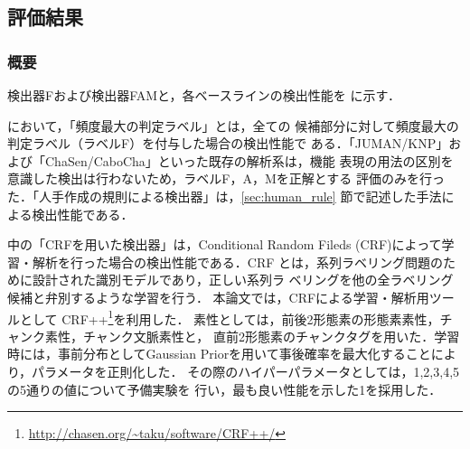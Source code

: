 \documentclass[japanese]{jnlp_1.2d}
\newcommand{\tabref}[1]{}
\begin{document}
\subsection{評価結果}

\subsubsection{概要}

検出器Fおよび検出器FAMと，各ベースラインの検出性能を
\tabref{tab:kekka_gaiyou}に示す．

\tabref{tab:kekka_gaiyou}において，「頻度最大の判定ラベル」とは，全ての
候補部分に対して頻度最大の判定ラベル（ラベルF）を付与した場合の検出性能で
ある．「JUMAN/KNP」および「ChaSen/CaboCha」といった既存の解析系は，機能
表現の用法の区別を意識した検出は行わないため，ラベルF，A，Mを正解とする
評価のみを行った．「人手作成の規則による検出器」は，\ref{sec:human_rule} 
節で記述した手法による検出性能である．

\tabref{tab:kekka_gaiyou}中の「CRFを用いた検出器」は，Conditional Random
Fileds (CRF)\cite{CRF}によって学習・解析を行った場合の検出性能である．CRF 
とは，系列ラベリング問題のために設計された識別モデルであり，正しい系列ラ
ベリングを他の全ラベリング候補と弁別するような学習を行う．
本論文では，CRFによる学習・解析用ツールとして
CRF++\footnote{\url{http://chasen.org/~taku/software/CRF++/}}を利用した．
素性としては，前後2形態素の形態素素性，チャンク素性，チャンク文脈素性と，
直前2形態素のチャンクタグを用いた．学習時には，事前分布としてGaussian
Priorを用いて事後確率を最大化することにより，パラメータを正則化した\cite{kudo.IPSJNL2004}．
その際のハイパーパラメータとしては，1,2,3,4,5の5通りの値について予備実験を
行い，最も良い性能を示した1を採用した．
\end{document}
